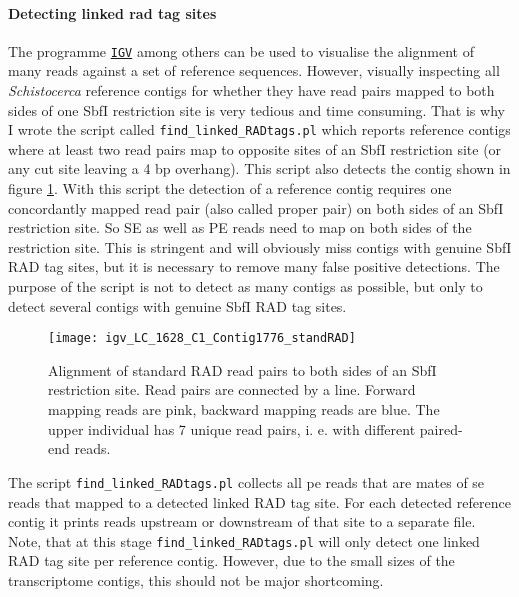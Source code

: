 \documentclass[a4paper,12pt,times,authoryear,twoside,print,index]{Classes/PhDThesisPSnPDF}\usepackage[]{graphicx}\usepackage[]{color}
\begin{document}
%
%
%

\paragraph{Detecting linked rad tag sites}\label{ch:find_linked_RADtags}
The programme \href{http://www.broadinstitute.org/software/igv/home}{\texttt{IGV}} among others can be used to visualise the alignment of many reads against a set of reference sequences. However, visually inspecting all \textit{Schistocerca} reference contigs for whether they have read pairs mapped to both sides of one SbfI restriction site is very tedious and time consuming. That is why I wrote the script called \texttt{find\_linked\_RADtags.pl} which reports reference contigs where at least two read pairs map to opposite sites of an SbfI restriction site (or any cut site leaving a 4 bp overhang). This script also detects the contig shown in figure \ref{LC.1628.C1.Contig1776_standRAD}. With this script the detection of a reference contig requires one \gls{concordant}ly mapped read pair (also called \gls{proper pair}) on both sides of an SbfI restriction site. So SE as well as PE reads need to map on both sides of the restriction site. This is stringent and will obviously miss contigs with genuine SbfI RAD tag sites, but it is necessary to remove many false positive detections. The purpose of the script is not to detect as many contigs as possible, but only to detect several contigs with genuine SbfI RAD tag sites.
%
\begin{figure}
\centering
\texttt{[image: igv\_LC\_1628\_C1\_Contig1776\_standRAD]}
\caption{Alignment of standard RAD read pairs to both sides of an SbfI restriction site. Read pairs are connected by a line. Forward mapping reads are pink, backward mapping reads are blue. The upper individual has 7 unique read pairs, i. e. with different paired-end reads.}
\label{LC.1628.C1.Contig1776_standRAD}
\end{figure}
%
The script \texttt{find\_linked\_RADtags.pl} collects all \gls{pe} reads that are mates of \gls{se} reads that mapped to a detected \gls{linked RAD tag site}. For each detected reference contig it prints reads upstream or downstream of that site to a separate file. Note, that at this stage \texttt{find\_linked\_RADtags.pl} will only detect one \gls{linked RAD tag site} per reference contig. However, due to the small sizes of the transcriptome contigs, this should not be major shortcoming.

%
%
%
\end{document}
